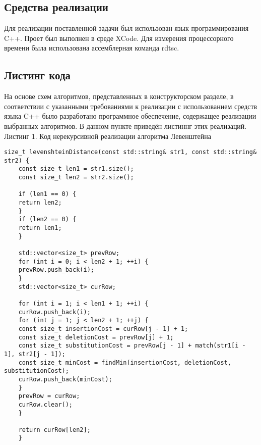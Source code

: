 \documentclass[a4paper, 14pt]{article}
\begin{document}
	
	\subsection{Средства реализации}
	
	Для реализации поставленной задачи был использован язык программирования C++\cite{litlink4}. Проет был выполнен в среде XCode\cite{litlink5}.
	Для измерения процессорного времени была использована ассемблерная команда rdtsc\cite{litlink6}.
	
	\subsection{Листинг кода}
	
		На основе схем алгоритмов, представленных в конструкторском разделе, в соответствии с указанными требованиями к реализации с использованием средств языка C++ было разработано программное обеспечение, содержащее реализации выбранных алгоритмов.
	В данном пункте приведён листиннг этих реализаций.\\
	
	
	\small Листинг 1. Код нерекурсивной реализации алгоритма Левенштейна \normalsize
	
	\begin{lstlisting}[frame=single, breaklines]
	size_t levenshteinDistance(const std::string& str1, const std::string& str2) {
	const size_t len1 = str1.size();
	const size_t len2 = str2.size();
	
	if (len1 == 0) {
	return len2;
	}
	if (len2 == 0) {
	return len1;
	}
	
	std::vector<size_t> prevRow;
	for (int i = 0; i < len2 + 1; ++i) {
	prevRow.push_back(i);
	}
	std::vector<size_t> curRow;
	
	for (int i = 1; i < len1 + 1; ++i) {
	curRow.push_back(i);
	for (int j = 1; j < len2 + 1; ++j) {
	const size_t insertionCost = curRow[j - 1] + 1;
	const size_t deletionCost = prevRow[j] + 1;
	const size_t substitutionCost = prevRow[j - 1] + match(str1[i - 1], str2[j - 1]);
	const size_t minCost = findMin(insertionCost, deletionCost, substitutionCost);
	curRow.push_back(minCost);
	}
	prevRow = curRow;
	curRow.clear();
	}
	
	return curRow[len2];
	}
	\end{lstlisting}
	
\end{document}
